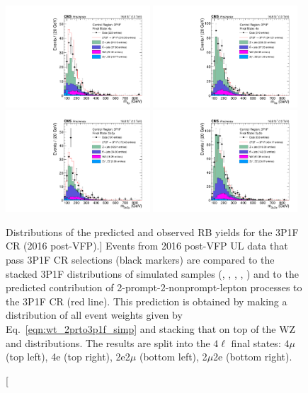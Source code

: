 \begin{figure}[!htbp]
	\begin{center}
		\includegraphics[width=0.48\textwidth]{figures/higgsmassmeas/redbkg/cr/UL2016postVFP_CR_3P1F_4mu.pdf}
		\includegraphics[width=0.48\textwidth]{figures/higgsmassmeas/redbkg/cr/UL2016postVFP_CR_3P1F_4e.pdf}
		\includegraphics[width=0.48\textwidth]{figures/higgsmassmeas/redbkg/cr/UL2016postVFP_CR_3P1F_2e2mu.pdf}
		\includegraphics[width=0.48\textwidth]{figures/higgsmassmeas/redbkg/cr/UL2016postVFP_CR_3P1F_2mu2e.pdf}
		\caption
			[Distributions of the predicted and observed RB yields for the 3P1F CR (2016 post-VFP).]
			{
			Events from 2016 post-VFP UL data that pass 3P1F CR selections (black markers) 
			are compared to the stacked 3P1F distributions of simulated samples
			(\Zplusjets, \ttbarplusjets, \WZ, \ZZ, \Zgammastar)
			and to the predicted contribution of 2-prompt-2-nonprompt-lepton processes to the 3P1F CR (red line).
			This prediction is obtained by making a distribution of all event weights given by Eq.~\ref{eqn:wt_2prto3p1f_simp} and stacking that on top of the WZ and \ZZ distributions.
			The results are split into the $4\ell$ final states:
			$4\mu$ (top left), 4e (top right), 2e2$\mu$ (bottom left), 2$\mu$2e (bottom right).
			}
		\label{cr_plots_3p1f_2016postvfp}
	\end{center}
\end{figure}
